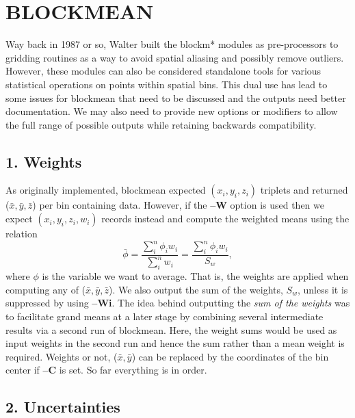 \documentclass[12pt,letterpaper,margin=0.5in]{report}
\begin{document}
\section*{BLOCKMEAN}

Way back in 1987 or so, Walter built the blockm* modules as pre-processors to gridding routines as a way to avoid spatial aliasing
and possibly remove outliers.  However, these modules can also be considered standalone tools for various
statistical operations on points within spatial bins.  This dual use has lead to some issues for blockmean that need to
be discussed and the outputs need better documentation.  We may also need to provide new options or modifiers
to allow the full range of possible outputs while retaining backwards compatibility.

\subsection*{1. Weights}
As originally implemented, blockmean expected $(x_i,y_i,z_i)$ triplets and returned ($\bar{x}, \bar{y}, \bar{z}$)
per bin containing data.
However, if the {\bf --W} option is used then we expect $(x_i,y_i,z_i,w_i)$ records instead and compute the weighted means
using the relation
\begin{equation}
	\bar{\phi} = \frac{\sum_i^n \phi_i w_i}{\sum_i^n w_i} = \frac{\sum_i^n \phi_i w_i}{S_w},
	\label{eq:weighted}
\end{equation}
where $\phi$ is the variable we want to average.  That is, the weights are applied when computing any of  ($\bar{x}, \bar{y}, \bar{z}$).
We also output the sum of the weights, $S_w$, unless it is suppressed by using {\bf--Wi}.  The idea
behind outputting the \emph{sum of the weights} was to facilitate grand means at a later stage by combining several
intermediate results via a second run of blockmean.  Here, the weight sums would be used as input weights in the second
run and hence the sum rather than a mean weight is required.
Weights or not, ($\bar{x}, \bar{y}$) can be replaced by the coordinates of the bin center if {\bf --C} is set.
So far everything is in order.

\subsection*{2. Uncertainties}
\end{document}
